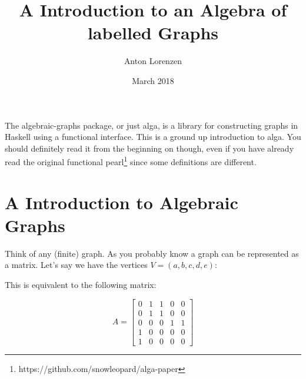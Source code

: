 \documentclass[a4paper,twocolumn]{article}
\begin{document}
\title{A Introduction to an Algebra of labelled Graphs}
\author{Anton Lorenzen}
\date{March 2018}

\maketitle

The algebraic-graphs package, or just alga, is a library for constructing graphs in Haskell using a functional interface.
This is a ground up introduction to alga. You should definitely read it from the beginning on though, even if
you have already read the original functional pearl\footnote{https://github.com/snowleopard/alga-paper} since some definitions are different. 

\section{A Introduction to Algebraic Graphs}

Think of any (finite) graph. As you probably know a graph can be represented as a matrix.
Let's say we have the vertices $V = (a, b, c, d, e)$:

\begin{center}
\end{center}

This is equivalent to the following matrix:

\[ A=
\begin{bmatrix}
  0 & 1 & 1 & 0 & 0 \\
  0 & 1 & 1 & 0 & 0 \\
  0 & 0 & 0 & 1 & 1 \\
  1 & 0 & 0 & 0 & 0 \\
  1 & 0 & 0 & 0 & 0
\end{bmatrix}
\]
\end{document}
